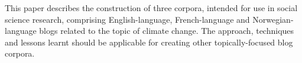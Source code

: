 This paper describes the construction of three corpora, intended for use in social science research, comprising English-language, French-language and Norwegian-language blogs related to the topic of climate change. The approach, techniques and lessons learnt should be applicable for creating other topically-focused blog corpora.
